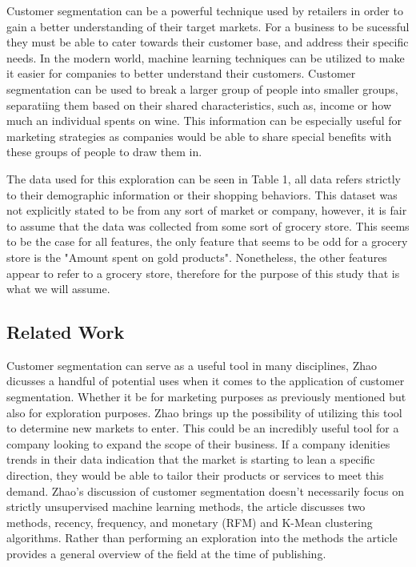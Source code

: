 \documentclass[twocolumn]{article}
\begin{document}
Customer segmentation can be a powerful technique used by retailers in order to gain a better understanding of their target markets. For a business to be sucessful they must be able to cater towards their customer base, and address their specific needs. In the modern world, machine learning techniques can be utilized to make it easier for companies to better understand their customers. Customer segmentation can be used to break a larger group of people into smaller groups, separatiing them based on their shared characteristics, such as, income or how much an individual spents on wine. This information can be especially useful for marketing strategies as companies would be able to share special benefits with these groups of people to draw them in.

The data used for this exploration can be seen in Table 1, all data refers strictly to their demographic information or their shopping behaviors.\cite{patel} This dataset was not explicitly stated to be from any sort of market or company, however, it is fair to assume that the data was collected from some sort of grocery store. This seems to be the case for all features, the only feature that seems to be odd for a grocery store is the "Amount spent on gold products". Nonetheless, the other features appear to refer to a grocery store, therefore for the purpose of this study that is what we will assume.

\subsection{Related Work}

Customer segmentation can serve as a useful tool in many disciplines, Zhao dicusses a handful of potential uses when it comes to the application of customer segmentation. Whether it be for marketing purposes as previously mentioned but also for exploration purposes. Zhao brings up the possibility of utilizing this tool to determine new markets to enter.\cite{zhao} This could be an incredibly useful tool for a company looking to expand the scope of their business. If a company idenities trends in their data indication that the market is starting to lean a specific direction, they would be able to tailor their products or services to meet this demand. Zhao's discussion of customer segmentation doesn't necessarily focus on strictly unsupervised machine learning methods, the article discusses two methods, recency, frequency, and monetary (RFM) and K-Mean clustering algorithms.\cite{zhao} Rather than performing an exploration into the methods the article provides a general overview of the field at the time of publishing.
\end{document}
